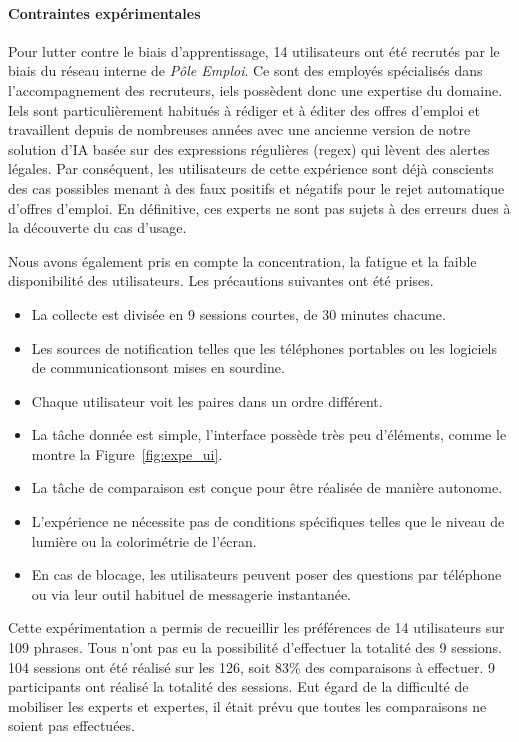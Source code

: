 \paragraph{Contraintes expérimentales}
Pour lutter contre le biais d'apprentissage, 14 utilisateurs ont été recrutés par le biais du réseau interne de \textit{P\^ole Emploi}. Ce sont des employés spécialisés dans l’accompagnement des recruteurs, iels possèdent donc une expertise du domaine. Iels sont particulièrement habitués à rédiger et à éditer des offres d'emploi et travaillent depuis de nombreuses années avec une ancienne version de notre solution d'IA basée sur des expressions régulières (regex) qui lèvent des alertes légales. Par conséquent, les utilisateurs de cette expérience sont déjà conscients des cas possibles menant à des faux positifs et négatifs pour le rejet automatique d'offres d'emploi. En définitive, ces experts ne sont pas sujets à des erreurs dues à la découverte du cas d'usage.

Nous avons également pris en compte la concentration, la fatigue et la faible disponibilité des utilisateurs. Les précautions suivantes ont été prises.
\begin{itemize}
    \item La collecte est divisée en 9 sessions courtes, de 30 minutes chacune.
    \item Les sources de notification telles que les téléphones portables ou les logiciels de communicationsont mises en sourdine.
    \item Chaque utilisateur voit les paires dans un ordre différent.
    \item La tâche donnée est simple, l'interface possède très peu d'éléments, comme le montre la Figure~\ref{fig:expe_ui}.
    \item La tâche de comparaison est conçue pour être réalisée de manière autonome.
    \item L'expérience ne nécessite pas de conditions spécifiques telles que le niveau de lumière ou la colorimétrie de l'écran.
    \item En cas de blocage, les utilisateurs peuvent poser des questions par téléphone ou via leur outil habituel de messagerie instantanée.
\end{itemize}

Cette expérimentation a permis de recueillir les préférences de 14 utilisateurs sur 109 phrases. Tous n'ont pas eu la possibilité d'effectuer la totalité des 9 sessions.
104 sessions ont été réalisé sur les 126, soit $83\%$ des comparaisons à effectuer.
9 participants ont réalisé la totalité des sessions. Eut égard de la difficulté de mobiliser les experts et expertes, il était prévu que toutes les comparaisons ne soient pas effectuées.

